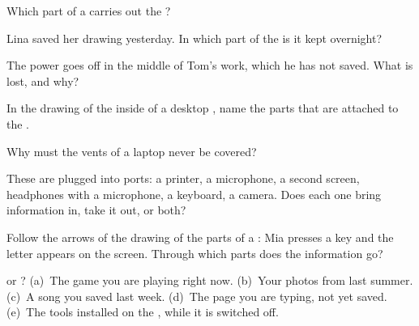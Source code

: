 \begin{exercise}[$\star$]\label{exo:g3:inside-the-computer:1}
Which part of a  carries out the ?
\end{exercise}

\begin{exercise}[$\star$]\label{exo:g3:inside-the-computer:2}
Lina saved her drawing yesterday. In which part of the  is it kept
overnight?
\end{exercise}

\begin{exercise}[$\star$]\label{exo:g3:inside-the-computer:3}
The power goes off in the middle of Tom's work, which he has not saved. What is
lost, and why?
\end{exercise}

\begin{exercise}[$\star$]\label{exo:g3:inside-the-computer:4}
In the drawing of the inside of a desktop , name the parts that are
attached to the .
\end{exercise}

\begin{exercise}[$\star$]\label{exo:g3:inside-the-computer:5}
Why must the vents of a laptop never be covered?
\end{exercise}

\begin{exercise}[$\star$]\label{exo:g3:inside-the-computer:6}
These  are plugged into ports: a printer, a microphone, a second screen,
headphones with a microphone, a keyboard, a camera. Does each one bring
information in, take it out, or both?
\end{exercise}

\begin{exercise}[$\star$]\label{exo:g3:inside-the-computer:7}
Follow the arrows of the drawing of the parts of a : Mia presses a key
and the letter appears on the screen. Through which parts does the information
go?
\end{exercise}

\begin{exercise}[$\star\star$]\label{exo:g3:inside-the-computer:8}
 or ? (a)~The game you are playing right now. (b)~Your photos from
last summer. (c)~A song you saved last week. (d)~The page you are typing,
not yet saved. (e)~The tools installed on the , while it is switched
off.
\end{exercise}

